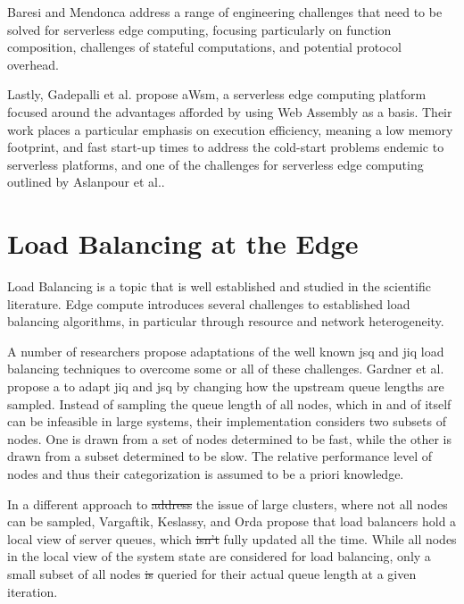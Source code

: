 \documentclass[draft,final]{vutinfth} %
\providecommand{\DIFaddtex}[1]{{\protect\color{blue}\uwave{#1}}} %
\providecommand{\DIFdeltex}[1]{{\protect\color{red}\sout{#1}}}                      %
\providecommand{\DIFaddbegin}{} %
\providecommand{\DIFaddend}{} %
\providecommand{\DIFdelbegin}{} %
\providecommand{\DIFdelend}{} %
\providecommand{\DIFadd}[1]{\texorpdfstring{\DIFaddtex{#1}}{#1}} %
\providecommand{\DIFdel}[1]{\texorpdfstring{\DIFdeltex{#1}}{}} %
\begin{document}
Baresi and Mendonca\cite{baresiServerlessPlatformEdge2019} address a range of engineering challenges that need to be solved for serverless edge computing, focusing particularly on function composition, challenges of stateful computations, and potential protocol overhead.

Lastly, Gadepalli et al. \cite{gadepalliChallengesOpportunitiesEfficient2019} propose aWsm, a serverless edge computing platform focused around the advantages afforded by using Web Assembly as a basis.
Their work places a particular emphasis on execution efficiency, meaning a low memory footprint, and fast start-up times to address the cold-start problems endemic to serverless platforms, and one of the challenges for serverless edge computing outlined by Aslanpour et al.\cite{aslanpourServerlessEdgeComputing2021}.


\section{Load Balancing at the Edge}
Load Balancing is a topic that is well established and studied in the scientific literature.
Edge compute introduces several challenges to established load balancing algorithms, in particular through resource and network heterogeneity\cite{gardnerScalableLoadBalancing2021}.

A number of researchers propose adaptations of the well known \gls{jsq} and \gls{jiq} load balancing techniques to overcome some or all of these challenges\cite{gardnerScalableLoadBalancing2021}\cite{wengOptimalLoadBalancing2020}\cite{vargaftikLSQLoadBalancing2020}.
Gardner et al. propose a to adapt \gls{jiq} and \gls{jsq} by changing how the upstream queue lengths are sampled.
Instead of sampling the queue length of all nodes, which in and of itself can be infeasible in large systems\cite{gardnerScalableLoadBalancing2021}, their implementation considers two subsets of nodes.
One is drawn from a set of nodes determined to be fast, while the other is drawn from a subset determined to be slow.
The relative performance level of nodes and thus their categorization is assumed to be a priori knowledge.

In a different approach to \DIFdelbegin \DIFdel{address }\DIFdelend \DIFaddbegin \DIFadd{addressing }\DIFaddend the issue of large clusters, where not all nodes can be sampled, Vargaftik, Keslassy, and Orda propose that load balancers hold a local view of server queues, which \DIFdelbegin \DIFdel{isn't }\DIFdelend \DIFaddbegin \DIFadd{is not }\DIFaddend fully updated all the time\cite{vargaftikLSQLoadBalancing2020}.
While all nodes in the local view of the system state are considered for load balancing, only a small subset of all nodes \DIFdelbegin \DIFdel{is }\DIFdelend \DIFaddbegin \DIFadd{are }\DIFaddend queried for their actual queue length at a given iteration.
\end{document}
